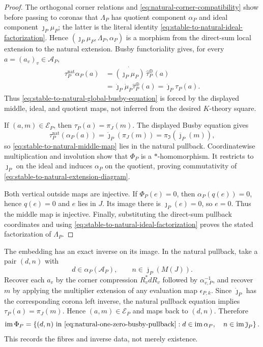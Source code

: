 \begin{proof}
The orthogonal corner relations and
\eqref{eq:natural-corner-compatibility} show before passing to coronas that
$\Lambda_P$ has quotient component $\alpha_P$ and ideal component
$\jmath_P\mu_P$; the latter is the literal identity
\eqref{eq:stable-to-natural-ideal-factorization}.  Hence
$(\jmath_P\mu_P,\Lambda_P,\alpha_P)$ is a morphism from the direct-sum local
extension to the natural extension.  Busby functoriality gives, for every
$a=(a_v)_v\in\mathcal A_P$,
\begin{align*}
 \tau_P^{\mathrm{nat}}\alpha_P(a)
 &=\dot{(\jmath_P\mu_P)}\,
      \widehat\tau_P^\oplus(a)\\
 &=\dot\jmath_P\dot\mu_P
      \widehat\tau_P^\oplus(a)
 =\dot\jmath_P\tau_P(a).
\end{align*}
Thus \eqref{eq:stable-to-natural-global-busby-equation} is forced by the
displayed middle, ideal, and quotient maps, not inferred from the desired
$K$-theory square.

If $(a,m)\in\mathcal E_P$, then
$\tau_P(a)=\pi_J(m)$.  The displayed Busby equation gives
\[
 \tau_P^{\mathrm{nat}}(\alpha_P(a))
 =\dot\jmath_P(\pi_J(m))
 =\pi_{\mathfrak I}(\overline\jmath_P(m)),
\]
so \eqref{eq:stable-to-natural-middle-map} lies in the natural pullback.
Coordinatewise multiplication and involution show that $\Phi_P$ is a
$*$-homomorphism.  It restricts to $\jmath_P$ on the ideal and induces
$\alpha_P$ on the quotient, proving commutativity of
\eqref{eq:stable-to-natural-extension-diagram}.

Both vertical outside maps are injective.  If $\Phi_P(e)=0$, then
$\alpha_P(q(e))=0$, hence $q(e)=0$ and $e$ lies in $J$.  Its image there is
$\jmath_P(e)=0$, so $e=0$.  Thus the middle map is injective.  Finally,
substituting the direct-sum pullback coordinates and using
\eqref{eq:stable-to-natural-ideal-factorization} proves the stated
factorization of $\Lambda_P$.
\end{proof}

The embedding has an exact inverse on its image.  In the natural pullback,
take a pair $(d,n)$ with
\[
 d\in\alpha_P(\mathcal A_P),\qquad
 n\in\overline\jmath_P(M(J)).
\]
Recover each $a_v$ by the corner compression
$R_v^*dR_v$ followed by $\alpha_{v,P}^{-1}$, and recover $m$ by applying the
multiplier extension of any evaluation map $\epsilon_{P,k}$.  Since
$\dot\jmath_P$ has the corresponding corona left inverse, the natural
pullback equation implies $\tau_P(a)=\pi_J(m)$.  Hence $(a,m)\in\mathcal
E_P$ and maps back to $(d,n)$.  Therefore
\begin{equation}
 \operatorname{im}\Phi_P
 =\left\{(d,n)\text{ in \eqref{eq:natural-one-zero-busby-pullback}}:
 d\in\operatorname{im}\alpha_P,\quad
 n\in\operatorname{im}\overline\jmath_P\right\}.
 \label{eq:stable-to-natural-image}
\end{equation}
This records the fibres and inverse data, not merely existence.

